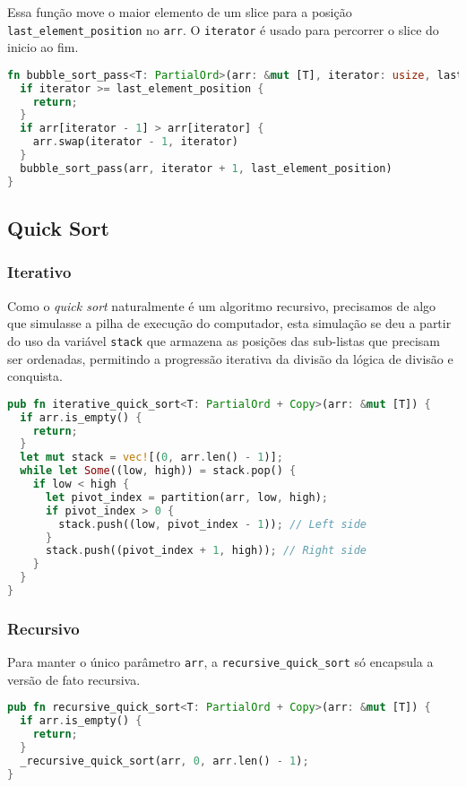 Essa função move o maior elemento de um slice para a posição \texttt{last\_element\_position} no \texttt{arr}. O \texttt{iterator} é usado para percorrer o slice do inicio ao fim.

\begin{lstlisting}[language=Rust]
fn bubble_sort_pass<T: PartialOrd>(arr: &mut [T], iterator: usize, last_element_position: usize) {
  if iterator >= last_element_position {
    return;
  }
  if arr[iterator - 1] > arr[iterator] {
    arr.swap(iterator - 1, iterator)
  }
  bubble_sort_pass(arr, iterator + 1, last_element_position)
}
\end{lstlisting}
\FloatBarrier

\subsection{Quick Sort}

\subsubsection{Iterativo}

Como o \textit{quick sort} naturalmente é um algoritmo recursivo, precisamos de algo que simulasse a pilha de execução do computador, esta simulação se deu a partir do uso da variável \texttt{stack} que armazena as posições das sub-listas que precisam ser ordenadas, permitindo a progressão iterativa da divisão da lógica de divisão e conquista.

\begin{lstlisting}[language=Rust]
pub fn iterative_quick_sort<T: PartialOrd + Copy>(arr: &mut [T]) {
  if arr.is_empty() {
    return;
  }
  let mut stack = vec![(0, arr.len() - 1)];
  while let Some((low, high)) = stack.pop() {
    if low < high {
      let pivot_index = partition(arr, low, high);
      if pivot_index > 0 {
        stack.push((low, pivot_index - 1)); // Left side
      }
      stack.push((pivot_index + 1, high)); // Right side
    }
  }
}
\end{lstlisting}
\FloatBarrier

\subsubsection{Recursivo}

Para manter o único parâmetro \texttt{arr}, a \texttt{recursive\_quick\_sort} só encapsula a versão de fato recursiva.

\begin{lstlisting}[language=Rust]
pub fn recursive_quick_sort<T: PartialOrd + Copy>(arr: &mut [T]) {
  if arr.is_empty() {
    return;
  }
  _recursive_quick_sort(arr, 0, arr.len() - 1);
}
\end{lstlisting}
\FloatBarrier

